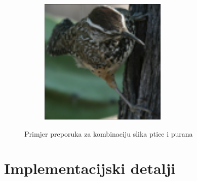 \documentclass[times, utf8, proizvoljni, numeric]{fer}
\begin{document}
\begin{figure}[ht!]
\begin{subfigure}[t]{0.19\textwidth}
	\end{subfigure}
	\begin{subfigure}[t]{0.19\textwidth}
		\includegraphics[width=\textwidth,height=\textwidth]{./imgs/demo-preporucitelja-po-sadrzaju/tijek-rada/id@182.png}
	\end{subfigure}
	\caption{Primjer preporuka za kombinaciju slika ptice i purana}
	\label{fg:demo_bird_v3}
		
\end{figure}



\section{Implementacijski detalji}
\end{document}
